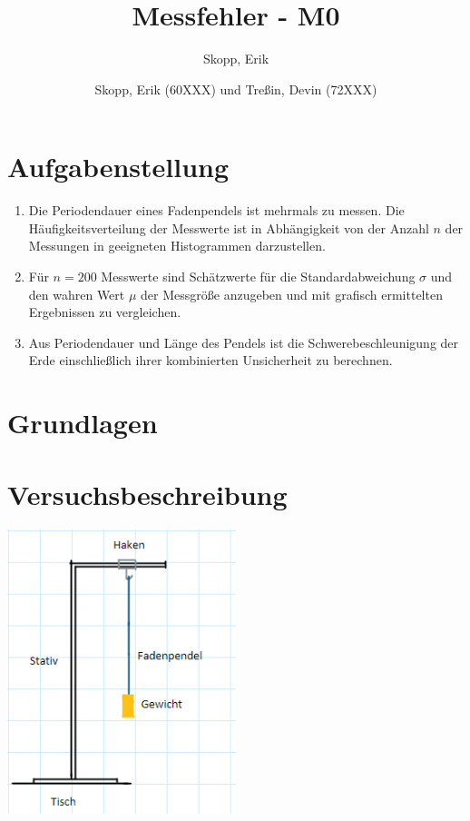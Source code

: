 \documentclass[fleqn,10pt]{olplainarticle}
\title{Messfehler - M0}
\author[1]{Skopp, Erik}
\author[2]{Skopp, Erik (60XXX) und Treßin, Devin (72XXX)}
\begin{document}
\flushbottom
\maketitle
\thispagestyle{empty}

\section{Aufgabenstellung}
\begin{enumerate}
    \item Die Periodendauer eines Fadenpendels ist mehrmals zu messen. Die Häufigkeitsverteilung der Messwerte ist in Abhängigkeit von der Anzahl $n$ der Messungen in geeigneten Histogrammen darzustellen. 

    \item Für $n = 200 $ Messwerte sind Schätzwerte für die Standardabweichung $ \sigma $  und den wahren Wert $\mu $ der Messgröße anzugeben und mit grafisch ermittelten Ergebnissen zu vergleichen. 

    \item  Aus Periodendauer und Länge des Pendels ist die Schwerebeschleunigung der Erde einschließlich ihrer kombinierten Unsicherheit zu berechnen. 
\end{enumerate}

\section{Grundlagen}


\section{Versuchsbeschreibung}
\includegraphics[width=0.5\textwidth]{Messfehler_M0/Experiment.png}
\end{document}
